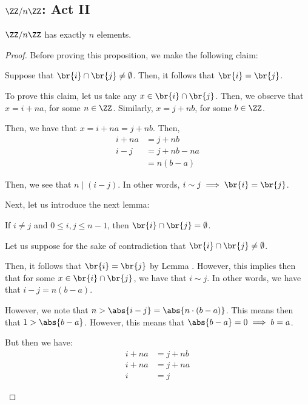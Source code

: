 \documentclass[openany]{book}
\begin{document}
\subsection{$\ZZ /n \ZZ$: Act II}
\begin{prop}
	$\ZZ/n\ZZ$ has exactly $n$ elements.
\end{prop}
\begin{proof}
	Before proving this proposition, we make the following claim:
	\begin{lem}
		Suppose that $\br{i} \cap \br{j} \neq \emptyset$. Then, it follows that $\br{i} = \br{j}$.
	\end{lem}
	\begin{innerproof}
		To prove this claim, let us take any $x \in \br{i} \cap \br{j}$. Then, we observe that $x = i + na$, for some $n \in \ZZ$. Similarly, $x = j + nb$, for some $b \in \ZZ$.
		
		Then, we have that $x = i + na = j + nb$. Then,
		\begin{align*}
			i + na &= j + nb \\
			i - j &= j + nb - na \\
			&= n(b-a)
		\end{align*}
	
		Then, we see that $n \mid (i - j)$. In other words, $i \sim j \implies \br{i} = \br{j}$.
	\end{innerproof}

	Next, let us introduce the next lemma:
	\begin{lem}
		If $i \neq j$ and $0 \leq i, j \leq n - 1$, then $\br{i} \cap \br{j} = \emptyset$.
	\end{lem}
	\begin{innerproof}
		Let us suppose for the sake of contradiction that $\br{i} \cap \br{j} \neq \emptyset$.
		
		Then, it follows that $\br{i} = \br{j}$ by Lemma . However, this implies then that for some $x \in \br{i} \cap \br{j}$, we have that $i \sim j$. In other words, we have that $i - j = n(b-a)$.
		
		However, we note that $n > \abs{i - j} = \abs{n \cdot (b-a)}$. This means then that $1 > \abs{b - a}$. However, this means that $\abs{b-a} = 0 \implies b = a$.
		
		But then we have:
		\begin{align*}
			i + na &= j + nb \\
			i + na &= j + na \\
			i &= j
		\end{align*}
	

\end{innerproof}
\end{proof}
\end{document}
